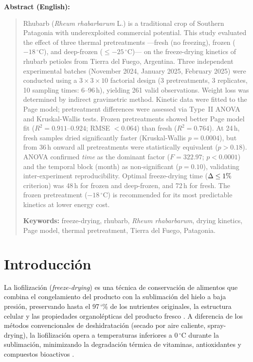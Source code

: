 \documentclass[12pt, a4paper]{article}
\newcommand{\pct}{\char`\%}
\begin{document}
\noindent\textbf{Abstract (English):}
\begin{quotation}
\noindent\small
Rhubarb (\textit{Rheum rhabarbarum} L.) is a traditional crop of Southern Patagonia with underexploited commercial potential. This study evaluated the effect of three thermal pretreatments ---fresh (no freezing), frozen ($-18\,^\circ$C), and deep-frozen ($\leq -25\,^\circ$C)--- on the freeze-drying kinetics of rhubarb petioles from Tierra del Fuego, Argentina. Three independent experimental batches (November 2024, January 2025, February 2025) were conducted using a $3 \times 3 \times 10$ factorial design (3 pretreatments, 3 replicates, 10 sampling times: 6--96\,h), yielding 261 valid observations. Weight loss was determined by indirect gravimetric method. Kinetic data were fitted to the Page model; pretreatment differences were assessed via Type~II ANOVA and Kruskal-Wallis tests. Frozen pretreatments showed better Page model fit ($R^2 = 0.911$--$0.924$; RMSE $< 0.064$) than fresh ($R^2 = 0.764$). At 24\,h, fresh samples dried significantly faster (Kruskal-Wallis $p = 0.0004$), but from 36\,h onward all pretreatments were statistically equivalent ($p > 0.18$). ANOVA confirmed \emph{time} as the dominant factor ($F = 322.97$; $p < 0.0001$) and the temporal block (month) as non-significant ($p = 0.10$), validating inter-experiment reproducibility. Optimal freeze-drying time ($\Delta \leq 1\pct{}$ criterion) was 48\,h for frozen and deep-frozen, and 72\,h for fresh. The frozen pretreatment ($-18\,^\circ$C) is recommended for its most predictable kinetics at lower energy cost.

\noindent\textbf{Keywords:} freeze-drying, rhubarb, \textit{Rheum rhabarbarum}, drying kinetics, Page model, thermal pretreatment, Tierra del Fuego, Patagonia.
\end{quotation}

\newpage

\section{Introducción}

La liofilización (\textit{freeze-drying}) es una técnica de conservación de alimentos que combina el congelamiento del producto con la sublimación del hielo a baja presión, preservando hasta el 97\,\pct{} de los nutrientes originales, la estructura celular y las propiedades organolépticas del producto fresco \citep{ratti2001,liapis2007}. A diferencia de los métodos convencionales de deshidratación (secado por aire caliente, spray-drying), la liofilización opera a temperaturas inferiores a $0\,^\circ$C durante la sublimación, minimizando la degradación térmica de vitaminas, antioxidantes y compuestos bioactivos \citep{marques2006}.
\end{document}
